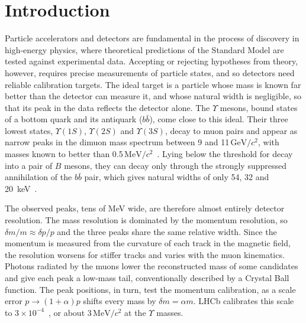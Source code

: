\documentclass[a4paper,11pt]{article}
\newcommand{\MeVcc}{\ensuremath{\mathrm{MeV}/c^2}}
\newcommand{\GeVcc}{\ensuremath{\mathrm{GeV}/c^2}}
\newcommand{\Ups}[1]{\ensuremath{\Upsilon(#1)}}               %
\begin{document}
\pagestyle{plain}
\tableofcontents

\section{Introduction}
\label{sec:intro}

Particle accelerators and detectors are fundamental in the process of discovery in high-energy physics, where theoretical predictions of the Standard Model are tested against experimental data.
Accepting or rejecting hypotheses from theory, however, requires precise measurements of particle states, and so detectors need reliable calibration targets.
The ideal target is a particle whose mass is known far better than the detector can measure it, and whose natural width is negligible, so that its peak in the data reflects the detector alone.
The $\Upsilon$ mesons, bound states of a bottom quark and its antiquark ($b\bar b$), come close to this ideal.
Their three lowest states, \Ups{1S}, \Ups{2S} and \Ups{3S}, decay to muon pairs and appear as narrow peaks in the dimuon mass spectrum between 9 and 11\,\GeVcc{}, with masses known to better than 0.5\,\MeVcc{}~\cite{ParticleDataGroup:2024cfk}.
Lying below the threshold for decay into a pair of $B$ mesons, they can decay only through the strongly suppressed annihilation of the $b\bar b$ pair, which gives natural widths of only 54, 32 and \SI{20}{keV}~\cite{ParticleDataGroup:2024cfk}.

The observed peaks, tens of MeV wide, are therefore almost entirely detector resolution.
The mass resolution is dominated by the momentum resolution, so $\delta m/m \approx \delta p/p$ and the three peaks share the same relative width.
Since the momentum is measured from the curvature of each track in the magnetic field, the resolution worsens for stiffer tracks and varies with the muon kinematics.
Photons radiated by the muons lower the reconstructed mass of some candidates and give each peak a low-mass tail, conventionally described by a Crystal Ball function.
The peak positions, in turn, test the momentum calibration, as a scale error $p \to (1+\alpha)p$ shifts every mass by $\delta m = \alpha m$.
LHCb calibrates this scale to $3\times10^{-4}$~\cite{LHCb:2023ood}, or about 3\,\MeVcc{} at the $\Upsilon$ masses.
\end{document}
